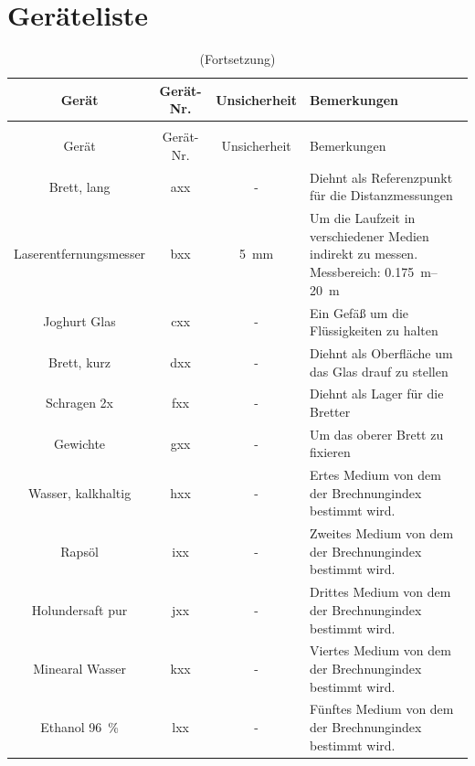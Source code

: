 \documentclass[11pt,ngerman]{scrartcl}
\begin{document}
\section{Geräteliste}
\label{sec:geraeteliste}
\begin{longtable}{c|c|S|p{15em}}
\caption[Geräteliste]{Verwendete Geräte \label{tab:geraeteliste}} \\  %
\toprule
Gerät                              & Gerät-Nr. & { Unsicherheit }  & Bemerkungen \\  
\midrule
\endfirsthead
\caption[]{(Fortsetzung)}\\
\toprule
Gerät                              & Gerät-Nr. & { Unsicherheit }  & Bemerkungen \\                                                                        
\midrule
\endhead
\endfoot
\endlastfoot
        Brett, lang            & axx & { - }       & Diehnt als Referenzpunkt für die Distanzmessungen\\ \hline
        Laserentfernungsmesser & bxx & \SI{5}{\mm} & Um die Laufzeit in verschiedener Medien indirekt zu messen. Messbereich: \SIrange{0.175}{20}{\meter} \cite{laserdistanzmesser}\\ \hline
        Joghurt Glas           & cxx & { - }       & Ein Gefäß um die Flüssigkeiten zu halten\\ \hline
        Brett, kurz            & dxx & { - }       & Diehnt als Oberfläche um das Glas drauf zu stellen\\ \hline
        Schragen 2x            & fxx & { - }       & Diehnt als Lager für die Bretter \\ \hline
        Gewichte               & gxx & { - }       & Um das oberer Brett zu fixieren\\ \hline
        Wasser, kalkhaltig     & hxx & { - }       & Ertes Medium von dem der Brechnungindex bestimmt wird.\\ \hline
        Rapsöl                     & ixx & { - }       & Zweites Medium von dem der Brechnungindex bestimmt wird.\\ \hline
        Holundersaft pur      & jxx & { - }       & Drittes Medium von dem der Brechnungindex bestimmt wird.\\ \hline
        Minearal Wasser        & kxx & { - }       & Viertes Medium von dem der Brechnungindex bestimmt wird.\\ \hline
        Ethanol \SI{96}{\percent} & lxx & { - } & Fünftes Medium von dem der Brechnungindex bestimmt wird.\\ \hline

        \hline
\end{longtable}
\end{document}
